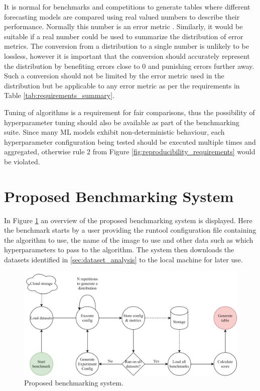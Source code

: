It is normal for benchmarks and competitions to generate tables where different forecasting models are compared using real valued numbers to describe their performance. Normally this number is an error metric \cite{m3_competition,makridakis_m4_2020,m5,hyndman_forecasting_3rd,salinas_deepar_2019,oreshkin_n_beats_2020}. Similarly, it would be suitable if a real number could be used to summarize the distribution of error metrics. The conversion from a distribution to a single number is unlikely to be lossless, however it is important that the conversion should accurately represent the distribution by benefiting errors close to 0 and punishing errors further away. Such a conversion should not be limited by the error metric used in the distribution but be applicable to any error metric as per the requirements in Table \ref{tab:requirements_summary}.

Tuning of algorithms is a requirement for fair comparisons, thus the possibility of hyperparameter tuning should also be available as part of the benchmarking suite. Since many ML models exhibit non-deterministic behaviour, each hyperparameter configuration being tested should be executed multiple times and aggregated, otherwise rule 2 from Figure \ref{fig:reproducibility_requirements} would be violated.

\section{Proposed Benchmarking System}
In Figure \ref{fig:proposed_benchmarking_system} an overview of the proposed benchmarking system is displayed. Here the benchmark starts by a user providing the runtool configuration file containing the algorithm to use, the name of the image to use and other data such as which hyperparameters to pass to the algorithm. The system then downloads the datasets identified in \ref{sec:dataset_analysis} to the local machine for later use.
\begin{figure}[h]
    \centering
    \includegraphics[width=\linewidth]{./img/benchmarking_system_architecture.png}
    \caption{Proposed benchmarking system.}
    \label{fig:proposed_benchmarking_system}
\end{figure}

